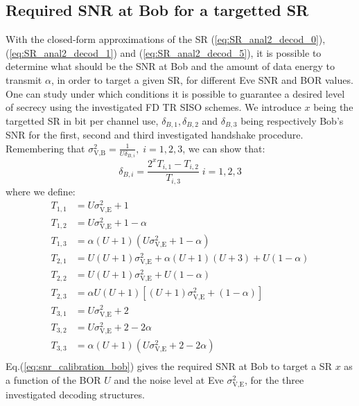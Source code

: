 \documentclass[journal,comsoc]{IEEEtran}
\begin{document}
\subsection{Required SNR at Bob for a targetted SR}
 \label{sec:required-snr-at-bob-for-a-targetted-sr}
With the closed-form approximations of the SR (\ref{eq:SR_anal2_decod_0}), (\ref{eq:SR_anal2_decod_1}) and (\ref{eq:SR_anal2_decod_5}), it is possible to determine what should be the SNR at Bob and the amount of data energy to transmit $\alpha$, in order to target a given SR, for different Eve SNR and BOR values. One can study under which conditions it is possible to guarantee a desired level of secrecy using the investigated FD TR SISO schemes. We introduce $x$ being the targetted SR in bit per channel use, $\delta_{B,1}, \delta_{B,2}$ and $\delta_{B,3}$ being respectively Bob's SNR for the first, second and third investigated handshake procedure. Remembering that $\sigma^2_{\text{V,B}} = \frac{1}{U\delta_{B,i}} , \;  i = 1,2,3$, we can show that:
\begin{equation}
	\delta_{B,i} = \frac{2^x T_{i,1} - T_{i,2} }{T_{i,3}} \; i = 1,2,3
	\label{eq:snr_calibration_bob}
\end{equation}
where we define: 
\begin{equation}
\begin{split}
	T_{1,1} &=  U\sigma_{\text{V,E}}^2+1\\
	T_{1,2} &=  U\sigma_{\text{V,E}}^2+1-\alpha\\
	T_{1,3} &=  \alpha(U+1)(U\sigma_{\text{V,E}}^2+1-\alpha) \\
	T_{2,1} &=  U(U+1)\sigma_{\text{V,E}}^2 + \alpha(U+1)(U+3)+U(1-\alpha)\\
	T_{2,2} &=   U(U+1)\sigma_{\text{V,E}}^2+U(1-\alpha) \\	
	T_{2,3} &=  \alpha U(U+1)\left[(U+1)\sigma_{\text{V,E}}^2+(1-\alpha)\right] \\
	T_{3,1} &=  U\sigma_{\text{V,E}}^2+2\\
	T_{3,2} &=  U\sigma_{\text{V,E}}^2+2-2\alpha\\
	T_{3,3} &=  \alpha(U+1)(U\sigma_{\text{V,E}}^2+2-2\alpha)\\
\end{split}
\end{equation} 
Eq.(\ref{eq:snr_calibration_bob})  gives the required SNR at Bob to target a SR $x$ as a function of the BOR $U$ and the noise level at Eve $\sigma_{\text{V,E}}^2$, for the three investigated decoding structures.
\end{document}
